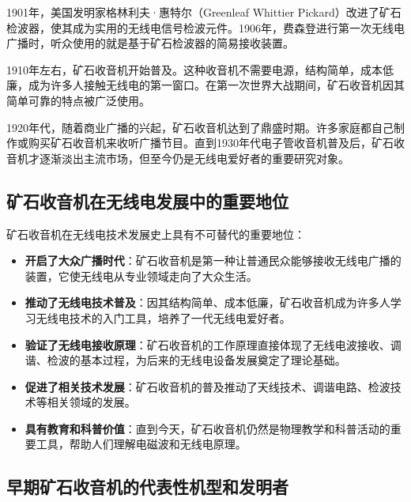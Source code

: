 \documentclass[12pt,UTF8]{ctexbook}
\begin{document}
1901年，美国发明家格林利夫·惠特尔（Greenleaf Whittier Pickard）改进了矿石检波器，使其成为实用的无线电信号检波元件。1906年，费森登进行第一次无线电广播时，听众使用的就是基于矿石检波器的简易接收装置。

1910年左右，矿石收音机开始普及。这种收音机不需要电源，结构简单，成本低廉，成为许多人接触无线电的第一窗口。在第一次世界大战期间，矿石收音机因其简单可靠的特点被广泛使用。

1920年代，随着商业广播的兴起，矿石收音机达到了鼎盛时期。许多家庭都自己制作或购买矿石收音机来收听广播节目。直到1930年代电子管收音机普及后，矿石收音机才逐渐淡出主流市场，但至今仍是无线电爱好者的重要研究对象。

\subsection{矿石收音机在无线电发展中的重要地位}

矿石收音机在无线电技术发展史上具有不可替代的重要地位：

\begin{itemize}[leftmargin=3.5em]
    \item \textbf{开启了大众广播时代}：矿石收音机是第一种让普通民众能够接收无线电广播的装置，它使无线电从专业领域走向了大众生活。
    \item \textbf{推动了无线电技术普及}：因其结构简单、成本低廉，矿石收音机成为许多人学习无线电技术的入门工具，培养了一代无线电爱好者。
    \item \textbf{验证了无线电接收原理}：矿石收音机的工作原理直接体现了无线电波接收、调谐、检波的基本过程，为后来的无线电设备发展奠定了理论基础。
    \item \textbf{促进了相关技术发展}：矿石收音机的普及推动了天线技术、调谐电路、检波技术等相关领域的发展。
    \item \textbf{具有教育和科普价值}：直到今天，矿石收音机仍然是物理教学和科普活动的重要工具，帮助人们理解电磁波和无线电原理。
\end{itemize}

\subsection{早期矿石收音机的代表性机型和发明者}
\end{document}
